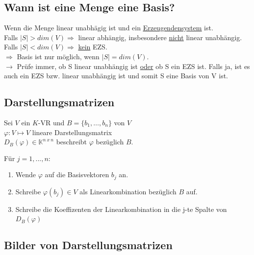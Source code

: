 \documentclass{scrartcl}
\newcommand{\linkTo}[1]{\hyperref[#1]{\underline{#1}}}
\begin{document}
\subsection{Wann ist eine Menge eine Basis?}

Wenn die Menge linear unabhägig ist und ein \linkTo{Erzeugendensystem} ist.\\
Falls $|S| > dim(V) \Rightarrow $ linear abhängig, insbesondere \underline{nicht} linear unabhängig.\\
Falls $|S| < dim(V) \Rightarrow $ \underline{kein} EZS.\\
$\Rightarrow$ Basis ist nur möglich, wenn $|S| = dim(V)$.\\
$\rightarrow$ Prüfe immer, ob S linear unabhängig ist \underline{oder} ob S ein EZS ist. Falls ja, ist es auch ein EZS bzw. linear unabhängig ist und somit S eine Basis von V ist.

\subsection{Darstellungsmatrizen}

\begin{Def}
Sei $V$ ein $K$-VR und $B = \{b_1, \dots, b_n\}$ von $V$\\


$\varphi : V \mapsto V $ lineare Darstellungsmatrix\\


$D_B(\varphi) \in \mathbb{K}^{n~x~n} $ beschreibt $\varphi$ bezüglich $B$.

\end{Def}

Für $j = 1, ..., n $:

\begin{enumerate}
\item Wende $\varphi$ auf die Basisvektoren $b_j$ an.
\item Schreibe $\varphi(b_j) \in V$ als Linearkombination bezüglich $B$ auf.
\item Schreibe die Koeffizenten der Linearkombination in die j-te Spalte von $D_B(\varphi)$
\end{enumerate}



\subsection{Bilder von Darstellungsmatrizen}
\end{document}

